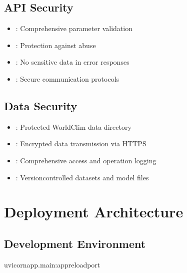\documentclass[letterpaper,10pt,english]{sphinxmanual}
\begin{document}
\subsection{API Security}
\label{\detokenize{architecture:api-security}}\begin{itemize}
\item {} 
\sphinxAtStartPar
{}: Comprehensive parameter validation

\item {} 
\sphinxAtStartPar
{}: Protection against abuse

\item {} 
\sphinxAtStartPar
{}: No sensitive data in error responses

\item {} 
\sphinxAtStartPar
{}: Secure communication protocols

\end{itemize}


\subsection{Data Security}
\label{\detokenize{architecture:data-security}}\begin{itemize}
\item {} 
\sphinxAtStartPar
{}: Protected WorldClim data directory

\item {} 
\sphinxAtStartPar
{}: Encrypted data transmission via HTTPS

\item {} 
\sphinxAtStartPar
{}: Comprehensive access and operation logging

\item {} 
\sphinxAtStartPar
{}: Version\sphinxhyphen{}controlled datasets and model files

\end{itemize}


\section{Deployment Architecture}
\label{\detokenize{architecture:deployment-architecture}}

\subsection{Development Environment}
\label{\detokenize{architecture:development-environment}}
\begin{sphinxVerbatim}[commandchars=\\\{\}]
uvicornapp.main:app\PYGZhy{}\PYGZhy{}reload\PYGZhy{}\PYGZhy{}port
\end{sphinxVerbatim}
\end{document}
